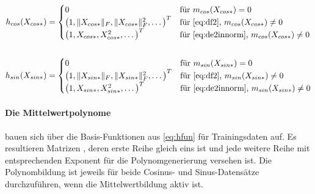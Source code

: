 \begin{align}\label{eq:hfun}
	h_{cos}(X_{cos*}) &=
		\begin{cases}
			0								                          & \text{für } m_{cos}(X_{cos*}) = 0 \\
			\big( 1, \|X_{cos*}\|_F, \|X_{cos*}\|_F^2, \ldots \big)^T & \text{für \autoref{eq:df2}, }       m_{cos}(X_{cos*}) \ne 0 \\
			\big( 1, X_{cos*}, X_{cos*}^2, \ldots \big)^T             & \text{für \autoref{eq:de2innorm}, } m_{cos}(X_{cos*}) \ne 0
		\end{cases} \nonumber \\
	\\
	h_{sin}(X_{sin*}) &=
		\begin{cases}
			0								                          & \text{für } m_{sin}(X_{sin*}) = 0 \\
			\big( 1, \|X_{sin*}\|_F, \|X_{sin*}\|_F^2, \ldots \big)^T & \text{für \autoref{eq:df2}, }       m_{sin}(X_{sin*}) \ne 0 \\
			\big( 1, X_{sin*}, X_{sin*}^2, \ldots \big)^T             & \text{für \autoref{eq:de2innorm}, } m_{sin}(X_{sin*}) \ne 0
		\end{cases} \nonumber
\end{align}


\clearpage


\paragraph*{Die Mittelwertpolynome} bauen sich über die Basis-Funktionen aus \autoref{eq:hfun} für Trainingsdaten auf. Es resultieren Matrizen \cite{Rasmussen2006}, deren erste Reihe gleich eins ist und jede weitere Reihe mit entsprechenden Exponent für die Polynomgenerierung versehen ist. Die Polynombildung ist jeweils für beide Cosinus- und Sinus-Datensätze durchzuführen, wenn die Mittelwertbildung aktiv ist.



